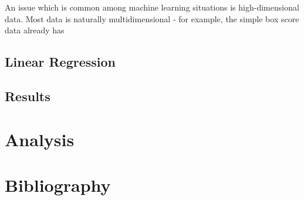 \documentclass[letterpaper]{article}
\begin{document}
An issue which is common among machine learning situations is high-dimensional data. Most data is naturally multidimensional - for example, the simple box score data already has 

\subsection{Linear Regression}

\subsection{Results}

\section{Analysis}

\section{Bibliography}
\end{document}
